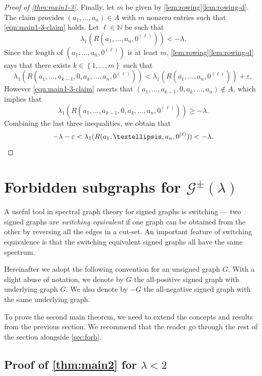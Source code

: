 \documentclass[11pt]{article}
\theoremstyle{definition}
\theoremstyle{remark}
\newcommand{\sset}[1]{\left\{{#1}\right\}}
\newcommand{\eps}{\varepsilon}
\newcommand{\la}{\lambda}
\newcommand{\G}{\mathcal{G}}
\newcommand{\N}{\mathbb{N}}
\newcommand{\Gs}{\G^\pm(\la)}
\begin{document}
\begin{proof}[Proof of \cref{thm:main1-3}]
    Finally, let $m$ be given by \cref{lem:rowing}\ref{lem:rowing-d}. The claim provides $(a_1, \dots, a_n) \in A$ with $m$ nonzero entries such that \eqref{eqn:main1-3-claim} holds. Let $\ell \in \N$ be such that
    \[
        \la_1(R(a_1, \dots, a_n, 0^{(\ell)})) < -\la.
    \]
    Since the length of $(a_1, \dots, a_n, 0^{(\ell)})$ is at least $m$, \cref{lem:rowing}\ref{lem:rowing-d} says that there exists $k \in \sset{1, \dots, m}$ such that
    \[
        \la_1(R(a_1, \dots, a_{k-1}, 0, a_k, \dots, a_n, 0^{(\ell)})) < \la_1(R(a_1, \dots, a_n, 0^{(\ell)})) + \eps,
    \]
    However \eqref{eqn:main1-3-claim} asserts that $(a_1, \dots, a_{k-1}, 0, a_k, \dots, a_n) \not\in A$, which implies that
    \[
        \la_1(R(a_1, \dots, a_{k-1}, 0, a_k, \dots, a_n, 0^{(\ell)})) \ge -\la.
    \]
    Combining the last three inequalities, we obtain that
    \begin{equation*}
        -\la - \eps < \la_1(R(a_1,\dots, a_n, 0^{(\ell)})) < -\la. \qedhere
    \end{equation*}
\end{proof}

\section{Forbidden subgraphs for \texorpdfstring{$\Gs$}{signed graphs with eigenvalues bounded from below}} \label{sec:forb-signed}

A useful tool in spectral graph theory for signed graphs is switching --- two signed graphs are \emph{switching equivalent} if one graph can be obtained from the other by reversing all the edges in a cut-set. An important feature of switching equivalence is that the switching equivalent signed graphs all have the same spectrum.

Hereinafter we adopt the following convention for an unsigned graph $G$. With a slight abuse of notation, we denote by $G$ the all-positive signed graph with underlying graph $G$. We also denote by $-G$ the all-negative signed graph with the same underlying graph.

To prove the second main theorem, we need to extend the concepts and results from the previous section. We recommend that the reader go through the rest of the section alongside \cref{sec:forb}.

\subsection{Proof of \texorpdfstring{\cref{thm:main2}}{the second main theorem} for \texorpdfstring{$\la < 2$}{λ < 2}}
\end{document}

